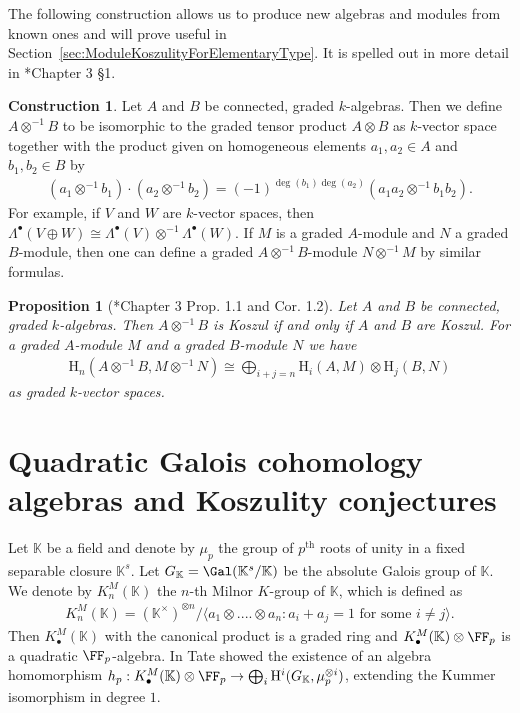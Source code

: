 \documentclass{amsart}
\newtheorem{prop}[thm]{Proposition}
\theoremstyle{definition}
\newtheorem{con}[thm]{Construction}
\theoremstyle{remark}
\newcommand{\rmH}{\mathrm{H}}
\numberwithin{equation}{section}
\begin{document}
The following construction allows us to produce new algebras and modules from known ones and will prove useful in Section~\ref{sec:ModuleKoszulityForElementaryType}. It is spelled out in more detail in \cite{PositselskiPolishchuk2005}*{Chapter 3 §1}.
\begin{con}
\label{con:TensorProductOfAlgebras}
    Let $A$ and $B$ be connected, graded $k$-algebras. Then we define $A\otimes^{-1}B$ to be isomorphic to the graded tensor product $A\otimes B$ as $k$-vector space together with the product given on homogeneous elements $a_1,a_2\in A$ and $b_1,b_2\in B$ by
    \begin{align*}
        (a_1\otimes^{-1} b_1)\cdot (a_2\otimes^{-1} b_2)=(-1)^{\deg(b_1)\deg(a_2)}(a_1a_2\otimes^{-1}b_1b_2).
    \end{align*}
    For example, if $V$ and $W$ are $k$-vector spaces, then $\Lambda^\bullet(V\oplus W)\cong \Lambda^\bullet(V)\otimes^{-1}\Lambda^\bullet(W)$. If $M$ is a graded $A$-module and $N$ a graded $B$-module, then one can define a graded $A\otimes^{-1}B$-module $N\otimes^{-1}M$ by similar formulas.
\end{con}
\begin{prop}[\cite{PositselskiPolishchuk2005}*{Chapter 3 Prop. 1.1 and Cor. 1.2}]
\label{prop:CohomologyOfTensorProduct}
    Let $A$ and $B$ be connected, graded $k$-algebras. Then $A\otimes^{-1}B$ is Koszul if and only if $A$ and $B$ are Koszul. For a graded $A$-module $M$ and a graded $B$-module $N$ we have
    \begin{align*}
        \rmH_{n}(A\otimes^{-1}B,M\otimes^{-1}N)\cong \bigoplus_{i+j=n}\rmH_i(A,M)\otimes \rmH_j(B,N)
    \end{align*}
    as graded $k$-vector spaces.
\end{prop}


\section{Quadratic Galois cohomology algebras and Koszulity conjectures}
\label{sec:GaloisCohomology}
Let $\mathbb{K}$ be a field and denote by $\mu_p$ the group of $p^{\text{th}}$ roots of unity in a fixed separable closure $\mathbb{K}^{s}$. Let $G_\mathbb{K}=\Gal(\mathbb{K}^{s}/\mathbb{K})$ be the absolute Galois group of $\mathbb{K}$. We denote by $K^M_n(\mathbb{K})$ the $n$-th Milnor $K$-group of $\mathbb{K}$, which is defined as
\begin{align*}
    K^M_n(\mathbb{K})=(\mathbb{K}^\times)^{\otimes n}/\langle a_1\otimes ....\otimes a_n:a_i+a_j=1\text{ for some }i\neq j\rangle.
\end{align*}
Then $K^M_\bullet(\mathbb{K})$ with the canonical product is a graded ring and $K^M_\bullet(\mathbb{K})\otimes \FF_p$ is a quadratic $\FF_p$-algebra. In \cite{Tate1976} Tate showed the existence of an algebra homomorphism $h_p:K^M_\bullet(\mathbb{K})\otimes \FF_p\to \bigoplus_{i}\rmH^i(G_\mathbb{K},\mu_p^{\otimes i})$, extending the Kummer isomorphism in degree $1$.
\end{document}
